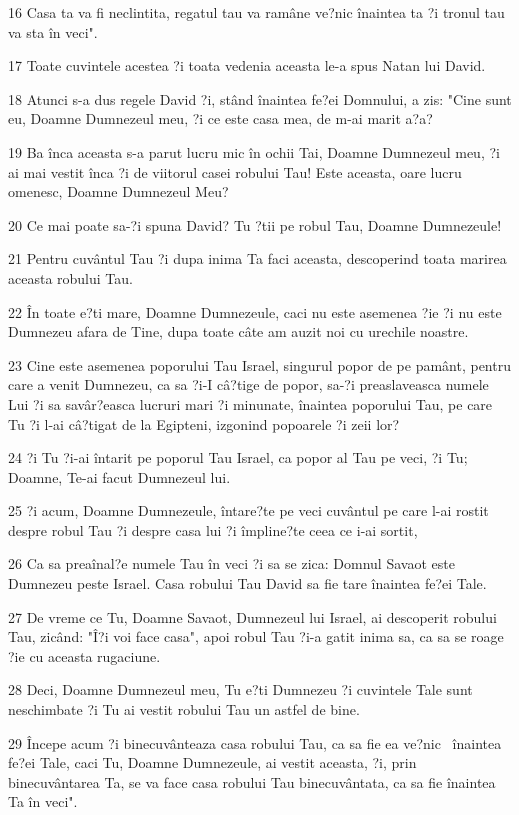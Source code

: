 \par 16 Casa ta va fi neclintita, regatul tau va ramâne ve?nic înaintea ta ?i tronul tau va sta în veci".
\par 17 Toate cuvintele acestea ?i toata vedenia aceasta le-a spus Natan lui David.
\par 18 Atunci s-a dus regele David ?i, stând înaintea fe?ei Domnului, a zis: "Cine sunt eu, Doamne Dumnezeul meu, ?i ce este casa mea, de m-ai marit a?a?
\par 19 Ba înca aceasta s-a parut lucru mic în ochii Tai, Doamne Dumnezeul meu, ?i ai mai vestit înca ?i de viitorul casei robului Tau! Este aceasta, oare lucru omenesc, Doamne Dumnezeul Meu?
\par 20 Ce mai poate sa-?i spuna David? Tu ?tii pe robul Tau, Doamne Dumnezeule!
\par 21 Pentru cuvântul Tau ?i dupa inima Ta faci aceasta, descoperind toata marirea aceasta robului Tau.
\par 22 În toate e?ti mare, Doamne Dumnezeule, caci nu este asemenea ?ie ?i nu este Dumnezeu afara de Tine, dupa toate câte am auzit noi cu urechile noastre.
\par 23 Cine este asemenea poporului Tau Israel, singurul popor de pe pamânt, pentru care a venit Dumnezeu, ca sa ?i-I câ?tige de popor, sa-?i preaslaveasca numele Lui ?i sa savâr?easca lucruri mari ?i minunate, înaintea poporului Tau, pe care Tu ?i l-ai câ?tigat de la Egipteni, izgonind popoarele ?i zeii lor?
\par 24 ?i Tu ?i-ai întarit pe poporul Tau Israel, ca popor al Tau pe veci, ?i Tu; Doamne, Te-ai facut Dumnezeul lui.
\par 25 ?i acum, Doamne Dumnezeule, întare?te pe veci cuvântul pe care l-ai rostit despre robul Tau ?i despre casa lui ?i împline?te ceea ce i-ai sortit,
\par 26 Ca sa preaînal?e numele Tau în veci ?i sa se zica: Domnul Savaot este Dumnezeu peste Israel. Casa robului Tau David sa fie tare înaintea fe?ei Tale.
\par 27 De vreme ce Tu, Doamne Savaot, Dumnezeul lui Israel, ai descoperit robului Tau, zicând: "Î?i voi face casa", apoi robul Tau ?i-a gatit inima sa, ca sa se roage ?ie cu aceasta rugaciune.
\par 28 Deci, Doamne Dumnezeul meu, Tu e?ti Dumnezeu ?i cuvintele Tale sunt neschimbate ?i Tu ai vestit robului Tau un astfel de bine.
\par 29 Începe acum ?i binecuvânteaza casa robului Tau, ca sa fie ea ve?nic  înaintea fe?ei Tale, caci Tu, Doamne Dumnezeule, ai vestit aceasta, ?i, prin binecuvântarea Ta, se va face casa robului Tau binecuvântata, ca sa fie înaintea Ta în veci".

